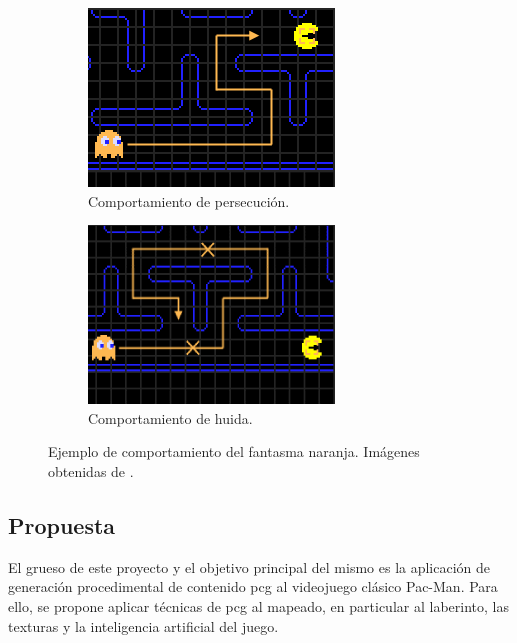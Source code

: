 \begin{figure}[H]
    \begin{center}
        \begin{subfigure}[b]{0.49\textwidth}
        \centering
            \includegraphics[scale=0.6]{img/orange1.png}
            \caption{Comportamiento de persecución.}
        \end{subfigure}
        \hfill
        \begin{subfigure}[b]{0.49\textwidth}
        \centering
            \includegraphics[scale=0.6]{img/orange2.png}
            \caption{Comportamiento de huida.}
        \end{subfigure}
        \caption{Ejemplo de comportamiento del fantasma naranja. Imágenes obtenidas de \cite{druid2016}.}
        \label{fig:blue}
    \end{center}
\end{figure}

\newpage
\subsection{Propuesta}

    El grueso de este proyecto y el objetivo principal del mismo es la aplicación de generación procedimental de contenido \acrshort{pcg} al videojuego clásico Pac-Man. Para ello, se propone aplicar técnicas de \acrshort{pcg} al mapeado, en particular al laberinto, las texturas y la inteligencia artificial del juego.


